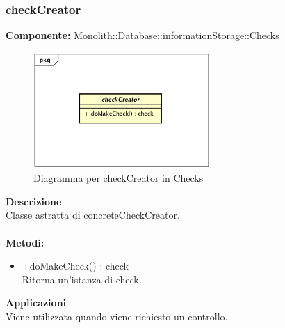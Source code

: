 \subsubsection{checkCreator}
\textbf{Componente:}  Monolith::Database::informationStorage::Checks\\
   \FloatBarrier
   \begin{figure}[ht]
   \centering
   \includegraphics[width=0.6\textwidth]{img/single-checkCreator}
   \caption{{Diagramma per checkCreator in Checks}}
\end{figure}
\FloatBarrier
\textbf{Descrizione}\\
Classe astratta di concreteCheckCreator. \\\\ 
\textbf{Metodi:} \begin{itemize}\item +doMakeCheck() : check \\Ritorna un'istanza di check.\end{itemize} 


\textbf{Applicazioni}\\
Viene utilizzata quando viene richiesto un controllo. 


\clearpage

